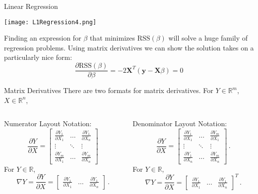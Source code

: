 \documentclass[10pt,handout]{beamer}
\begin{document}
\begin{frame}[fragile]{Linear Regression}
  \begin{minipage}[t][0.5\textheight][t]{\textwidth}
    \centering
     \texttt{[image: L1Regression4.png]}
  \end{minipage}
  \vfill
  \begin{minipage}[t][0.5\textheight][t]{\textwidth}
Finding an expression for $\beta$ that minimizes $\text{RSS}(\beta)$ will solve a huge family of regression problems. Using matrix derivatives we can show the solution takes on a particularly nice form:
$$
\frac{\partial \text{RSS}(\beta)}{\partial \beta} = -2\mathbf{X}^T(\mathbf{y} - \mathbf{X}\beta) = 0
$$
  \end{minipage}
\end{frame}


\begin{frame}[fragile]{Matrix Derivatives}
There are two formats for matrix derivatives. For $Y\in \mathbb{R}^m$, $X\in \mathbb{R}^n$,\vspace{2em}
\begin{columns}
\begin{column}{0.5\textwidth}
Numerator Layout Notation:
$$\frac{\partial Y}{\partial X} = 
\left[ 
\begin{matrix}
\frac{\partial Y_1}{\partial X_1} & \ldots & \frac{\partial Y_1}{\partial X_n} \\
\vdots& \ddots &\vdots \\
\frac{\partial Y_m}{\partial X_1}&\ldots&\frac{\partial Y_m}{\partial X_n} 
\end{matrix}
\right]$$
For $Y\in \mathbb{R}$,
$$\nabla Y =\frac{\partial Y}{\partial X} = 
\left[ 
\begin{matrix}
\frac{\partial Y_1}{\partial X_1}& \ldots & \frac{\partial Y_1}{\partial X_n}
\end{matrix}
\right]\,.$$
\end{column}
\begin{column}{0.5\textwidth}  %
Denominator Layout Notation:
$$\frac{\partial Y}{\partial X} = 
\left[ 
\begin{matrix}
\frac{\partial Y_1}{\partial X_1} & \ldots & \frac{\partial Y_m}{\partial X_1} \\
\vdots& \ddots &\vdots \\
\frac{\partial Y_1}{\partial X_n}&\ldots &\frac{\partial Y_m}{\partial X_n} 
\end{matrix}
\right]\,.$$
For $Y\in \mathbb{R}$,
$$\nabla Y = \frac{\partial Y}{\partial X} = 
\left[ 
\begin{matrix}
\frac{\partial Y_1}{\partial X_1}& \ldots & \frac{\partial Y_1}{\partial X_n}
\end{matrix}
\right]^T\,.$$
\end{column}
\end{columns}
\end{frame}
\end{document}
